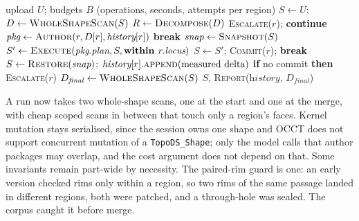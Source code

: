 \documentclass[10pt,onecolumn]{article}
\newcommand{\code}[1]{\texttt{\small #1}}
\begin{document}
\begin{algorithm}[h]
\caption{Region-scoped repair. Kernel mutation stays serialised; only package authoring may overlap.}
\label{alg:region}
\footnotesize
\begin{algorithmic}[1]
\Require upload $U$; budgets $B$ (operations, seconds, attempts per region)
\State $S \gets U$; \quad $D \gets \textsc{WholeShapeScan}(S)$ 
\State $R \gets \textsc{Decompose}(D)$ 
   \State \textsc{Escalate}($r$); \textbf{continue} \EndIf
    \State $\textit{pkg} \gets \textsc{Author}(r, D[r], \textit{history}[r])$ 
     \State \textbf{break} \EndIf
    \State $\textit{snap} \gets \textsc{Snapshot}(S)$
    \State $S' \gets \textsc{Execute}(\textit{pkg}.\textit{plan}, S, \textbf{within } r.\textit{locus})$
      \State $S \gets S'$; \textsc{Commit}($r$); \textbf{break}
    \EndIf
    \State $S \gets \textsc{Restore}(\textit{snap})$;
           $\textit{history}[r].\textsc{append}(\text{measured delta})$ 
  \EndFor
  \State \textbf{if} no commit \textbf{then} \textsc{Escalate}($r$) 
\EndFor
\State $D_{\textit{final}} \gets \textsc{WholeShapeScan}(S)$ 
\State \Return $S$, \textsc{Report}($\textit{history}$, $D_{\textit{final}}$)
\end{algorithmic}
\end{algorithm}

A run now takes two whole-shape scans, one at the start and one at the merge, with cheap scoped
scans in between that touch only a region's faces. Kernel mutation stays serialised, since the
session owns one shape and OCCT does not support concurrent mutation of a \code{TopoDS\_Shape}; only
the model calls that author packages may overlap, and the cost argument does not depend on that.
Some invariants remain part-wide by necessity. The paired-rim guard is one: an early version checked
rims only within a region, so two rims of the same passage landed in different regions, both were
patched, and a through-hole was sealed. The corpus caught it before merge.
\end{document}
